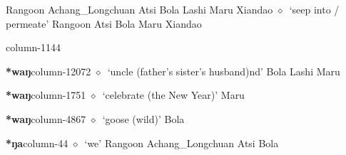          Rangoon 
\hspace{1ex}
         Achang\_Longchuan 
\hspace{1ex}
         Atsi 
\hspace{1ex}
         Bola 
\hspace{1ex}
         Lashi 
\hspace{1ex}
         Maru 
\hspace{1ex}
         Xiandao 
\hspace{1ex}
         $\diamond$~`seep into / permeate'
         Rangoon 
\hspace{1ex}
         Atsi 
\hspace{1ex}
         Bola 
\hspace{1ex}
         Maru 
\hspace{1ex}
         Xiandao 
  \item {\footnotesize \textbf{}}{\tiny column-1144}
  \item {\footnotesize \textbf{*waŋ}}{\tiny column-12072}
         $\diamond$~`uncle (father's sister's husband)nd'
         Bola 
\hspace{1ex}
         Lashi 
\hspace{1ex}
         Maru 
  \item {\footnotesize \textbf{*waŋ}}{\tiny column-1751}
         $\diamond$~`celebrate (the New Year)'
         Maru 
  \item {\footnotesize \textbf{*waŋ}}{\tiny column-4867}
         $\diamond$~`goose (wild)'
         Bola 
  \item {\footnotesize \textbf{*ŋa}}{\tiny column-44}
         $\diamond$~`we'
         Rangoon 
\hspace{1ex}
         Achang\_Longchuan 
\hspace{1ex}
         Atsi 
\hspace{1ex}
         Bola 
